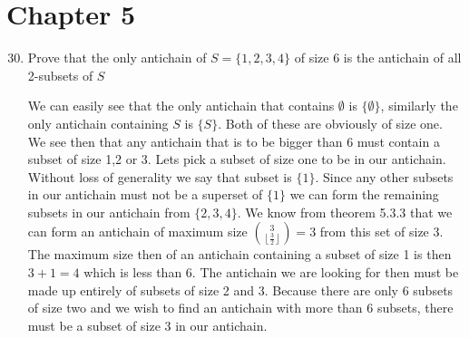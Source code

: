 \documentclass{article}
\begin{document}
\section*{Chapter 5}
\begin{enumerate}
\setcounter{enumi}{29}\item
Prove that the only antichain of $S=\{1,2,3,4\}$ of size 6 is the antichain of all 2-subsets of $S$

We can easily see that the only antichain that contains $\emptyset$ is $\{\emptyset\}$, similarly the only antichain containing $S$ is $\{S\}$. Both of these are obviously of size one. We see then that any antichain that is to be bigger than 6 must contain a subset of size 1,2 or 3. Lets pick a subset of size one to be in our antichain. Without loss of generality we say that subset is $\{1\}$. Since any other subsets in our antichain must not be a superset of $\{1\}$ we can form the remaining subsets in our antichain from $\{2,3,4\}$. We know from theorem 5.3.3 that we can form an antichain of maximum size $\binom{3}{\left\lfloor \frac{3}{2}\right\rfloor}=3$ from this set of size 3. The maximum size then of an antichain containing a subset of size 1 is then $3+1=4$ which is less than 6. The antichain we are looking for then must be made up entirely of subsets of size 2 and 3. Because there are only 6 subsets of size two and we wish to find an antichain with more than 6 subsets, there must be a subset of size 3 in our antichain.


\end{enumerate}
\end{document}
